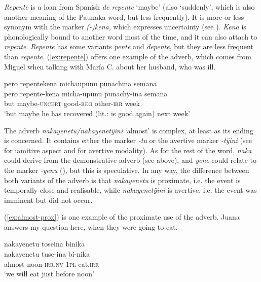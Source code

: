 \textit{Repente} is a loan from Spanish \textit{de repente} ‘maybe’ (also ‘suddenly’, which is also another meaning of the Paunaka word, but less frequently). It is more or less synonym with the  marker \textit{(-)kena}, which expresses uncertainty (see ). \textit{Kena} is phonologically bound to another word most of the time, and it can also attach to \textit{repente}. \textit{Repente} has some variants \textit{pente} and \textit{depente}, but they are less frequent than \textit{repente}. (\ref{ex:repente}) offers one example of the adverb, which comes from Miguel when talking with María C. about her husband, who was ill.

\ea\label{ex:repente}
\begingl
\glpreamble pero repentekena michaupunu punachina semana\\
\gla pero repente-kena micha-upunu punachÿ-ina semana\\
\glb but maybe-\textsc{uncert} good-\textsc{reg} other-\textsc{irr} week\\
\glft ‘but maybe he has recovered (lit.: is good again) next week’
\endgl
\trailingcitation{[mux-c110810l.037]}
\xe


The adverb \textit{nakayenetu/nakayenetÿini} ‘almost’ is complex, at least as its ending is concerned. It contains either the  marker \textit{-tu} or the avertive marker \textit{-tÿini} (see  for iamitive aspect and  for avertive modality). As for the rest of the word, \textit{naka} could derive from the demonstrative adverb (see  above), and \textit{yene} could relate to the  marker \textit{-yenu} (), but this is speculative. In any way, the difference between both variants of the adverb is that \textit{nakayenetu} is proximate, i.e. the event is temporally close and realisable, while \textit{nakayenetÿini} is avertive, i.e. the event was imminent but did not occur.


(\ref{ex:almost-prox}) is one example of the proximate use of the adverb. Juana answers my question here, when they were going to eat.

\ea\label{ex:almost-prox}
\begingl
\glpreamble nakayenetu toseina binika\\
\gla nakayenetu tuse-ina bi-nika\\
\glb almost noon-\textsc{irr.nv} 1\textsc{pl}-eat.\textsc{irr}\\
\glft ‘we will eat just before noon’
\endgl
\trailingcitation{[jxx-p110923l-2.099]}
\xe

